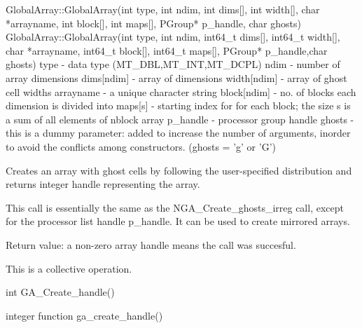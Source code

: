 \documentclass[12pt]{article}
\begin{document}
\begin{cxxapi}
GlobalArray::GlobalArray(int type, int ndim, int dims[], int width[],
                         char *arrayname, int block[], int maps[],
                         PGroup* p_handle, char ghosts)
GlobalArray::GlobalArray(int type, int ndim, int64_t dims[], 
                         int64_t width[], char *arrayname, 
                         int64_t block[], int64_t maps[],
                         PGroup* p_handle,char ghosts)
   type          - data type (MT_DBL,MT_INT,MT_DCPL)                      \access{[input]}
   ndim          - number of array dimensions                             \access{[input]}
   dims[ndim]    - array of dimensions                                    \access{[input]}
   width[ndim]   - array of ghost cell widths                             \access{[input]}
   arrayname     - a unique character string                              \access{[input]}
   block[ndim]   - no. of blocks each dimension is divided into           \access{[input]}
   maps[s]       - starting index for for each block;
                   the size s is a sum of all elements of nblock array    \access{[input]}
   p_handle      - processor group handle                                 \access{[input]}
   ghosts        - this is a dummy parameter: added to increase the
                   number of arguments, inorder to avoid the conflicts
                   among constructors. (ghosts = 'g' or 'G')              \access{[input]}
\end{cxxapi}

\begin{desc}

Creates an array with ghost cells by following the user-specified distribution and returns integer handle representing the array.

This call is essentially the same as the NGA_Create_ghosts_irreg call, except for the processor list handle p_handle. It can be used to create mirrored arrays.

Return value: a non-zero array handle means the call was succesful.

This is a collective operation.

\end{desc}



\begin{capi}
int GA_Create_handle()
\end{capi}

\begin{fapi}
integer function ga_create_handle()
\end{fapi}
\end{document}
